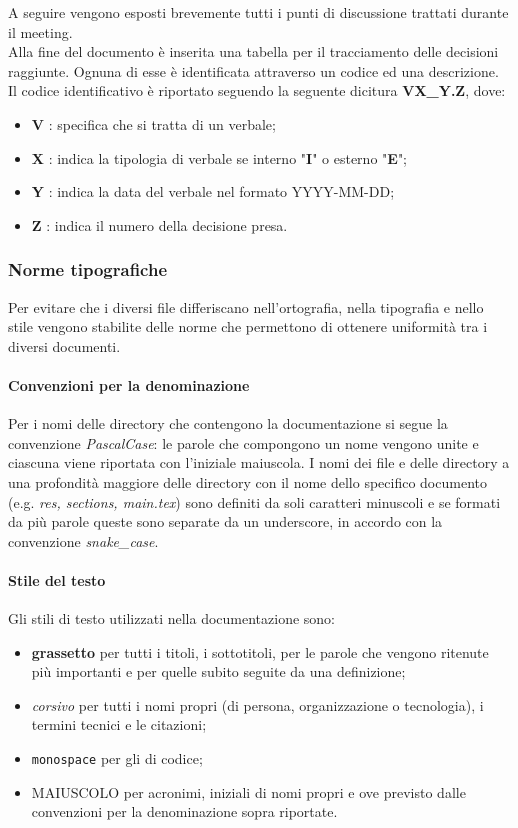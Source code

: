 A seguire vengono esposti brevemente tutti i punti di discussione trattati durante il meeting.\\
Alla fine del documento è inserita una tabella per il tracciamento delle decisioni raggiunte. Ognuna di esse è identificata attraverso un codice ed una descrizione.\\
Il codice identificativo è riportato seguendo la seguente dicitura \textbf{VX\_Y.Z}, dove:
\begin{itemize}
    \item \textbf{V} : specifica che si tratta di un verbale;
    \item \textbf{X} : indica la tipologia di verbale se interno "\textbf{I}" o esterno "\textbf{E}";
    \item \textbf{Y} : indica la data del verbale nel formato YYYY-MM-DD;
    \item \textbf{Z} : indica il numero della decisione presa.
\end{itemize}

\subsubsection{Norme tipografiche} \label{_normetipografiche}
Per evitare che i diversi file differiscano nell'ortografia, nella tipografia e nello stile vengono stabilite delle norme che permettono di ottenere uniformità tra i diversi documenti.

\paragraph{Convenzioni per la denominazione}
Per i nomi delle directory che contengono la documentazione si segue la convenzione \textit{PascalCase}: le parole che compongono un nome vengono unite e ciascuna viene riportata con l'iniziale maiuscola. I nomi dei file  e delle directory a una profondità maggiore delle directory con il nome dello specifico documento (e.g. \textit{res, sections, main.tex}) sono definiti da soli caratteri minuscoli e se formati da più parole queste sono separate da un underscore,  in accordo con la convenzione \textit{snake\_case}.

\paragraph{Stile del testo}
Gli stili di testo utilizzati nella documentazione sono:
\begin{itemize}
    \item \textbf{grassetto} per tutti i titoli, i sottotitoli, per le parole che vengono ritenute più importanti e per quelle subito seguite da una definizione;
    \item \textit{corsivo} per tutti i nomi propri (di persona, organizzazione o tecnologia), i termini tecnici e le citazioni;
    \item \texttt{monospace} per gli  di codice;
    \item MAIUSCOLO per acronimi, iniziali di nomi propri e ove previsto dalle convenzioni per la denominazione sopra riportate.
\end{itemize}

